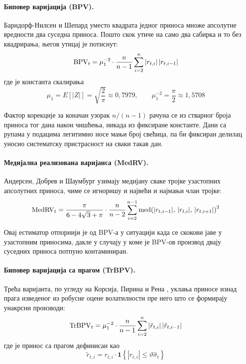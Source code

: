 \paragraph{Биповер варијација (BPV).}
Барндорф-\hspace{0pt}Нилсен и Шепард \parencite{bns2004} уместо квадрата једног
приноса множе
апсолутне вредности два суседна приноса. Пошто скок утиче на само два сабирка и то
без квадрирања, његов утицај је потиснут:
\begin{equation}
\mathrm{BPV}_t = \mu_1^{-2}\cdot\frac{n}{n-1}\sum_{i=2}^{n}\left|r_{t,i}\right|\left|r_{t,i-1}\right|
\end{equation}
где је константа скалирања
\begin{equation}
\mu_1 = E\!\left[|Z|\right] = \sqrt{\frac{2}{\pi}} \approx 0{,}7979,
\qquad
\mu_1^{-2} = \frac{\pi}{2} \approx 1{,}5708
\end{equation}

Фактор корекције за коначан узорак $n/(n-1)$ рачуна се из стварног броја приноса тог
дана након чишћења, никада из фиксиране константе. Дани са рупама у подацима легитимно
носе мањи број свећица, па би фиксиран делилац уносио систематску пристрасност на
сваки такав дан.

\paragraph{Медијална реализована варијанса (MedRV).}
Андерсен, Добрев и Шаумбург \parencite{andersen2012} узимају медијану сваке тројке
узастопних апсолутних приноса, чиме се игноришу и највећи и најмањи члан тројке:
\begin{equation}
\mathrm{MedRV}_t = \frac{\pi}{6 - 4\sqrt{3} + \pi}\cdot\frac{n}{n-2}
\sum_{i=2}^{n-1}\operatorname{med}\!\left(|r_{t,i-1}|,\,|r_{t,i}|,\,|r_{t,i+1}|\right)^{2}
\end{equation}

Овај естиматор отпорнији је од BPV-а у ситуацији када се скокови јаве у узастопним
приносима, дакле у случају у коме је BPV-ов производ двају суседних приноса потпуно
контаминиран.

\paragraph{Биповер варијација са прагом (TrBPV).}
Трећа варијанта, по угледу на Корсија, Пирина и Рена \parencite{corsiPirinoReno2010},
уклања приносе изнад прага изведеног из робусне оцене волатилности пре него што се
формирају унакрсни производи:
\begin{equation}
\mathrm{TrBPV}_t = \mu_1^{-2}\cdot\frac{n}{n-1}
\sum_{i=2}^{n}\left|\tilde{r}_{t,i}\right|\left|\tilde{r}_{t,i-1}\right|
\end{equation}
где је принос са прагом дефинисан као
\begin{equation}
\tilde{r}_{t,i} = r_{t,i}\cdot\mathbf{1}\!\left\{|r_{t,i}| \le \vartheta\hat{\sigma}_t\right\}
\end{equation}

